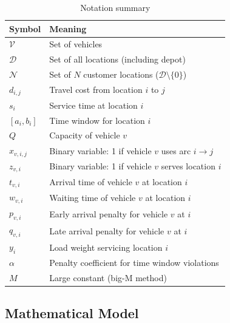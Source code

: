 \begin{table}[ht]
	\renewcommand{\arraystretch}{1.3}
	\caption{Notation summary}
	\label{tab:notation}
	\centering
	\begin{tabular}{l|l}
		\hline\hline
		Symbol & Meaning  \\
		\hline \hline
		$\mathcal{V}$ & Set of vehicles \\ 
        \hline
        $\mathcal{D}$ & Set of all locations (including depot) \\
        \hline
        $\mathcal{N}$ & Set of $N$ customer locations ($\mathcal{D}\setminus\{0\}$) \\
        \hline
        $d_{i,j}$ & Travel cost from location $i$ to $j$ \\
        \hline
        $s_i$ & Service time at location $i$ \\
		\hline
        $[a_i,b_i]$ & Time window for location $i$\\
        \hline
        $Q$ & Capacity of vehicle $v$ \\
        \hline
        $x_{v,i,j}$ & Binary variable: 1 if vehicle $v$ uses arc $i\rightarrow j$ \\
        \hline
        $z_{v,i}$ & Binary variable: 1 if vehicle $v$ serves location $i$\\
        \hline
        $t_{v,i}$ & Arrival time of vehicle $v$ at location $i$\\
        \hline
        $w_{v,i}$ & Waiting time of vehicle $v$ at location $i$\\
        \hline
        $p_{v,i}$ & Early arrival penalty for vehicle $v$ at $i$ \\ 
        \hline
        $q_{v,i}$ & Late arrival penalty for vehicle $v$ at $i$ \\ 
        \hline
        $y_{i}$ & Load weight servicing location $i$\\
        \hline
        $\alpha$ & Penalty coefficient for time window violations\\
        \hline
        $M$ & Large constant (big-M method)\\
        \hline \hline
	\end{tabular}
\end{table}

\subsection{Mathematical Model}

